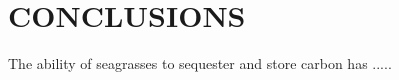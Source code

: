\chapter{CONCLUSIONS}		\label{another chapter}

The ability of seagrasses to sequester and store carbon has .....

